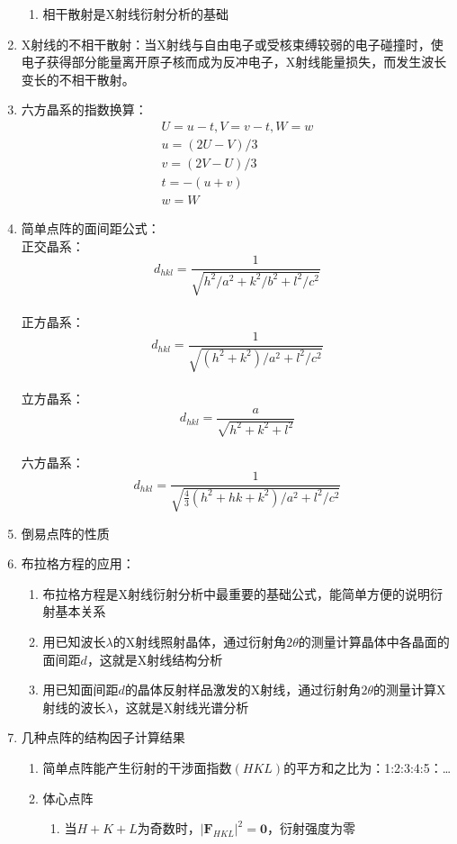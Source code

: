 \documentclass[12pt,a4paper]{article}
\begin{document}
\begin{enumerate}
\begin{enumerate}
            \item 相干散射是X射线衍射分析的基础
        \end{enumerate}
        \item X射线的不相干散射：当X射线与自由电子或受核束缚较弱的电子碰撞时，使电子获得部分能量离开原子核而成为反冲电子，X射线能量损失，而发生波长变长的不相干散射。
        \item 六方晶系的指数换算：$$\begin{array}{c}{U=u-t, V=v-t, W=w} \\ {u=(2 U-V) / 3} \\ {v=(2 V-U) / 3} \\ {t=-(u+v)} \\ {w=W}\end{array}$$
        \item 简单点阵的面间距公式：
        \\正交晶系：$$d_{h k l}=\frac{1}{\sqrt{h^{2} / a^{2}+k^{2} / b^{2}+l^{2} / c^{2}}}$$
        \\正方晶系：$$d_{h k l}=\frac{1}{\sqrt{\left(h^{2}+k^{2}\right) / a^{2}+l^{2} / c^{2}}}$$
        \\立方晶系：$$d_{h k l}=\frac{a}{\sqrt{h^{2}+k^{2}+l^{2}}}$$
        \\六方晶系：$$d_{h k l}=\frac{1}{\sqrt{\frac{4}{3}\left(h^{2}+h k+k^{2}\right) / a^{2}+l^{2} / c^{2}}}$$
        \item 倒易点阵的性质
        \item 布拉格方程的应用：
        \begin{enumerate}
            \item 布拉格方程是X射线衍射分析中最重要的基础公式，能简单方便的说明衍射基本关系
            \item 用已知波长$\lambda$的X射线照射晶体，通过衍射角$2\theta$的测量计算晶体中各晶面的面间距$d$，这就是X射线结构分析
            \item 用已知面间距$d$的晶体反射样品激发的X射线，通过衍射角$2\theta$的测量计算X射线的波长$\lambda$，这就是X射线光谱分析 
        \end{enumerate}
        \item 几种点阵的结构因子计算结果
        \begin{enumerate}
                \item 简单点阵能产生衍射的干涉面指数$(HKL)$的平方和之比为：1:2:3:4:5：\dots
                \item 体心点阵
                \begin{enumerate}
                    \item 当$H+K+L$为奇数时，$\left|\boldsymbol{F}_{H K L}\right|^{2}=\mathbf{0}$，衍射强度为零

\end{enumerate}
\end{enumerate}
\end{enumerate}
\end{document}
